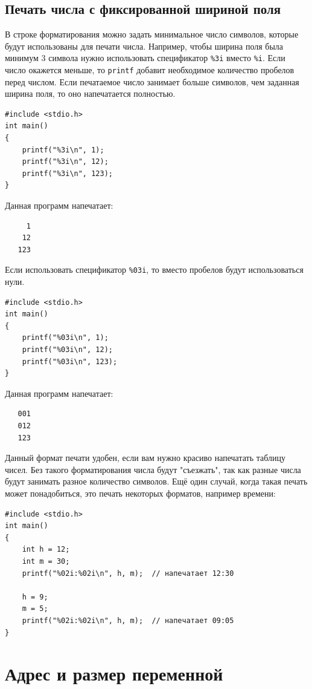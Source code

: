 \documentclass[10pt]{article}
\begin{document}
\subsection*{Печать числа с фиксированной шириной поля}
В строке форматирования можно задать минимальное число символов, которые будут использованы для печати числа. Например, чтобы ширина поля была минимум 3 символа нужно использовать спецификатор \texttt{\%3i} вместо \texttt{\%i}.
Если число окажется меньше, то \texttt{printf} добавит необходимое количество пробелов перед числом. Если печатаемое число занимает больше символов, чем заданная ширина поля, то оно напечатается полностью.
\begin{lstlisting}
#include <stdio.h>
int main()
{
    printf("%3i\n", 1);
    printf("%3i\n", 12);
    printf("%3i\n", 123);
}
\end{lstlisting}
Данная программ напечатает:
\begin{verbatim}
     1
    12
   123
\end{verbatim}
Если использовать спецификатор \texttt{\%03i}, то вместо пробелов будут использоваться нули.
\begin{lstlisting}
#include <stdio.h>
int main()
{
    printf("%03i\n", 1);
    printf("%03i\n", 12);
    printf("%03i\n", 123);
}
\end{lstlisting}
Данная программ напечатает:
\begin{verbatim}
   001
   012
   123
\end{verbatim}
Данный формат печати удобен, если вам нужно красиво напечатать таблицу чисел. Без такого форматирования числа будут "съезжать"{}, так как разные числа будут занимать разное количество символов. Ещё один случай, когда такая печать может понадобиться, это печать некоторых форматов, например времени:
\begin{lstlisting}
#include <stdio.h>
int main()
{
	int h = 12;
	int m = 30;
	printf("%02i:%02i\n", h, m);  // напечатает 12:30
	
	h = 9;
	m = 5;
	printf("%02i:%02i\n", h, m);  // напечатает 09:05
}
\end{lstlisting}


\newpage
\section*{Адрес и размер переменной}
\end{document}
